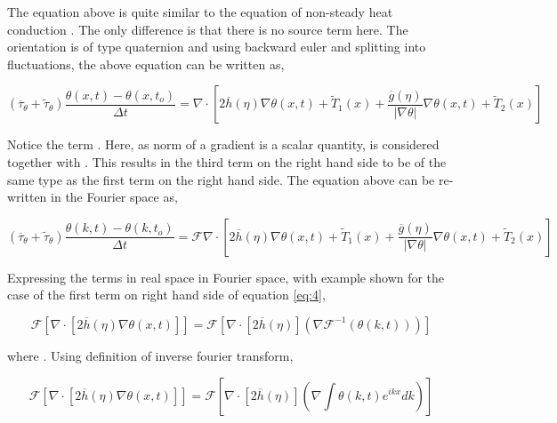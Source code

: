 \documentclass[a4paper,11pt,dvipsnames]{article}
\begin{document}
The equation above is quite similar to the equation of non-steady heat conduction \cite{Shanthraj2019}. 
The only difference is that there is no source term here. 
The orientation \mathsym{\theta} is of type quaternion and 
using backward euler and splitting into fluctuations, the above equation can be written as, 

\begin{equation}
\left ( \overline{\tau}_\theta + \tilde{\tau}_\theta \right ) \frac{\theta (x,t) - \theta (x,t_o)}{\Delta t} = 
\nabla \cdot \left [ 2 \overline{h}(\eta) \nabla \theta (x,t) + \tilde{T}_1 (x) + 
\frac{\overline{g}(\eta)}{\left | \nabla \theta \right |} \nabla \theta (x,t) + \tilde{T}_2 (x)\right ] \label{eq:3}
\end{equation}

Notice the term . 
Here, as norm of a gradient is a scalar quantity, \mathsym{\left | \nabla \theta \right |} is 
considered together with . 
This results in the third term on the right hand side to be of the same type as the first term on the right hand side. 
The equation above can be re-written in the Fourier space as,

\begin{equation}
\left ( \overline{\tau}_\theta + \tilde{\tau}_\theta \right ) \frac{\theta (k,t) - \theta (k,t_o)}{\Delta t} = 
\mathcal{F} \nabla \cdot \left [ 2 \overline{h}(\eta) \nabla \theta (x,t) + \tilde{T}_1 (x) + 
\frac{\overline{g}(\eta)}{\left | \nabla \theta \right |} \nabla \theta (x,t) + \tilde{T}_2 (x)\right ] \label{eq:4}
\end{equation}

Expressing the terms in real space in Fourier space, with example shown for the case of the first term on right hand side of 
equation \ref{eq:4}, 

\begin{equation}
\mathcal{F} \left [ \nabla \cdot \left [ 2 \overline{h}(\eta) \nabla \theta (x,t) \right ] \right ] = 
\mathcal{F} \left [ \nabla \cdot \left [ 2 \overline{h}(\eta) \right ] \left ( \nabla \mathcal{F}^{-1} \left (\theta (k,t) \right ) \right ) \right ] \label{eq:5}
\end{equation}

where . 
Using definition of inverse fourier transform, 

\begin{equation}
\mathcal{F} \left [ \nabla \cdot \left [ 2 \overline{h}(\eta) \nabla \theta (x,t) \right ] \right ] = 
\mathcal{F} \left [ \nabla \cdot \left [ 2 \overline{h}(\eta) \right ] \left ( \nabla \int \theta (k,t) e^{ikx} dk \right ) \right ] \label{eq:6}
\end{equation}
\end{document}

